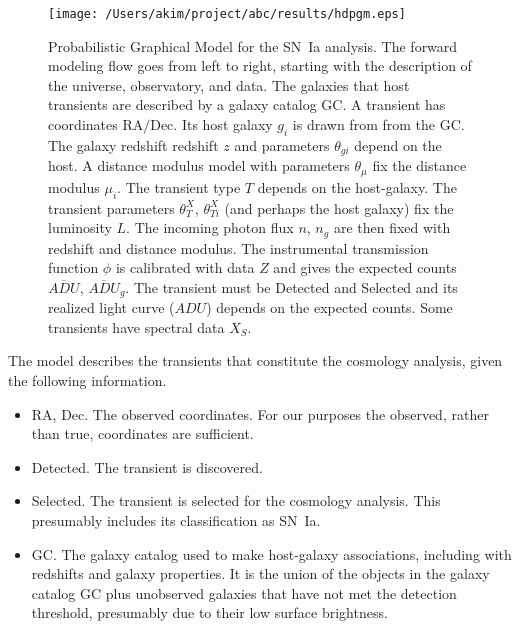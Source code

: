 \documentclass[preprint]{aastex}
\begin{document}
\begin{figure}[htbp] %
   \centering
   \texttt{[image: /Users/akim/project/abc/results/hdpgm.eps]} 
   \caption{Probabilistic Graphical Model for the SN~Ia analysis.  
   The forward modeling
   flow goes from left to right, starting with the description of the universe, observatory,
   and data.  The galaxies that host transients are described by a galaxy catalog GC. 
   A transient has
   coordinates  $\text{RA/Dec}$.  Its host galaxy $g_i$ is drawn from from the GC.
   The galaxy redshift redshift $z$ and parameters $\theta_{gi}$ depend on the host.
   A distance modulus model with parameters $\theta_\mu$ fix the distance modulus $\mu_i$.
   The transient type $T$ depends on the host-galaxy.   The transient
   parameters $\theta_T^X$, $\theta_{Ti}^X$ (and perhaps the host galaxy) fix the luminosity $L$.       The 
   incoming photon flux $n$, $n_g$  are then fixed
   with redshift and distance modulus.
   The instrumental transmission function $\phi$ is calibrated with data ${Z}$ and
   gives the expected
   counts $\overline{\mathit{ADU}}$, $\overline{\mathit{ADU}}_g$. 
   The transient must be Detected and Selected and its realized light curve (${ADU}$) depends on the expected counts.  Some transients have spectral data
   ${X}_S$.
   \label{pgm:fig}}
\end{figure}


The model describes the transients that constitute the cosmology analysis, given the following
information.  
\begin{itemize}
\item ${\text{RA}}$, ${\text{Dec}}$.  The observed
coordinates.  For our purposes the observed, rather than true, coordinates are sufficient.
\item Detected.  The transient is discovered.
\item Selected. The transient is selected for the cosmology analysis.  This presumably
includes its classification as SN~Ia.
\item GC.  The galaxy catalog used to make host-galaxy associations, including with
redshifts and galaxy properties.  It is
the union of the objects in the galaxy catalog GC
plus unobserved galaxies that have not
met the detection threshold, presumably due to their low surface brightness.
\end{itemize}
\end{document}
